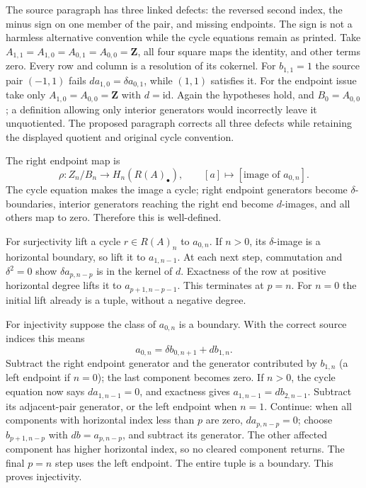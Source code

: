 The source paragraph has three linked defects: the reversed second index, the minus sign on one member of the pair, and missing endpoints. The sign is not a harmless alternative convention while the cycle equations remain as printed. Take \(A_{1,1}=A_{1,0}=A_{0,1}=A_{0,0}=\mathbf Z\), all four square maps the identity, and other terms zero. Every row and column is a resolution of its cokernel. For \(b_{1,1}=1\) the source pair \((-1,1)\) fails \(d a_{1,0}=\delta a_{0,1}\), while \((1,1)\) satisfies it. For the endpoint issue take only \(A_{1,0}=A_{0,0}=\mathbf Z\) with \(d=\mathrm{id}\). Again the hypotheses hold, and \(B_0=A_{0,0}\); a definition allowing only interior generators would incorrectly leave it unquotiented. The proposed paragraph corrects all three defects while retaining the displayed quotient and original cycle convention.

The right endpoint map is \[
\rho:Z_n/B_n\to H_n(R(A)_\bullet),\qquad
[a]\mapsto[\text{image of }a_{0,n}].
\] The cycle equation makes the image a cycle; right endpoint generators become \(\delta\)-boundaries, interior generators reaching the right end become \(d\)-images, and all others map to zero. Therefore this is well-defined.

For surjectivity lift a cycle \(r\in R(A)_n\) to \(a_{0,n}\). If \(n>0\), its \(\delta\)-image is a horizontal boundary, so lift it to \(a_{1,n-1}\). At each next step, commutation and \(\delta^2=0\) show \(\delta a_{p,n-p}\) is in the kernel of \(d\). Exactness of the row at positive horizontal degree lifts it to \(a_{p+1,n-p-1}\). This terminates at \(p=n\). For \(n=0\) the initial lift already is a tuple, without a negative degree.

For injectivity suppose the class of \(a_{0,n}\) is a boundary. With the correct source indices this means \[
a_{0,n}=\delta b_{0,n+1}+d b_{1,n}.
\] Subtract the right endpoint generator and the generator contributed by \(b_{1,n}\) (a left endpoint if \(n=0\)); the last component becomes zero. If \(n>0\), the cycle equation now says \(d a_{1,n-1}=0\), and exactness gives \(a_{1,n-1}=d b_{2,n-1}\). Subtract its adjacent-pair generator, or the left endpoint when \(n=1\). Continue: when all components with horizontal index less than \(p\) are zero, \(d a_{p,n-p}=0\); choose \(b_{p+1,n-p}\) with \(d b=a_{p,n-p}\), and subtract its generator. The other affected component has higher horizontal index, so no cleared component returns. The final \(p=n\) step uses the left endpoint. The entire tuple is a boundary. This proves injectivity.

